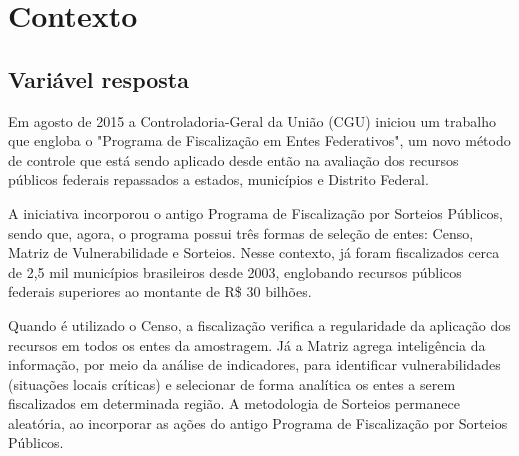 \chapter{Contexto}
\label{cap:contexto}
\section{Variável resposta}
\label{sec:variavel_resposta}

Em agosto de 2015 a Controladoria-Geral da União (CGU) iniciou um trabalho que engloba o "Programa de Fiscalização em Entes Federativos", um novo método de controle que está sendo aplicado desde então na avaliação dos recursos públicos federais repassados a estados, municípios e Distrito Federal.

A iniciativa incorporou o antigo Programa de Fiscalização por Sorteios Públicos, sendo que, agora, o programa possui três formas de seleção de entes: Censo, Matriz de Vulnerabilidade e Sorteios. Nesse contexto, já foram fiscalizados cerca de 2,5 mil municípios brasileiros desde 2003, englobando recursos públicos federais superiores ao montante de R\$ 30 bilhões.

Quando é utilizado o Censo, a fiscalização verifica a regularidade da aplicação dos recursos em todos os entes da amostragem. Já a Matriz agrega inteligência da informação, por meio da análise de indicadores, para identificar vulnerabilidades (situações locais críticas) e selecionar de forma analítica os entes a serem fiscalizados em determinada região. A metodologia de Sorteios permanece aleatória, ao incorporar as ações do antigo Programa de Fiscalização por Sorteios Públicos.


